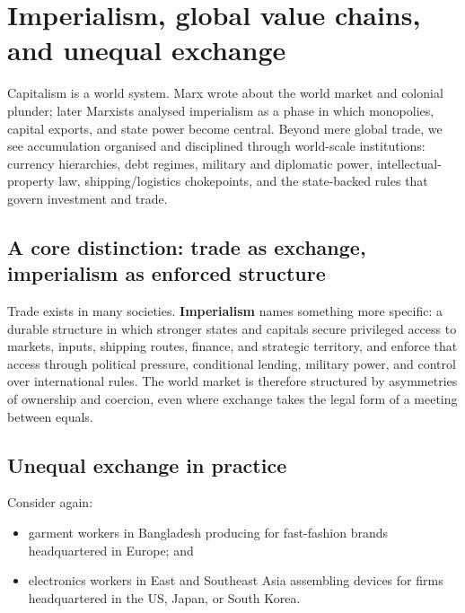 \section{Imperialism, global value chains, and unequal exchange}
\label{sec:imperialism}

Capitalism is a world system. Marx wrote about the world market and colonial plunder; later Marxists
analysed imperialism as a phase in which monopolies, capital exports, and state power become central.\cite{LeninImperialism,PatnaikImperialism}
Beyond mere global trade, we see accumulation organised and
disciplined through world-scale institutions: currency hierarchies, debt regimes, military and diplomatic
power, intellectual-property law, shipping/logistics chokepoints, and the state-backed rules that govern
investment and trade.

\subsection{A core distinction: trade as exchange, imperialism as enforced structure}
\label{sec:imperialism-trade-structure}

Trade exists in many societies. \textbf{Imperialism} names something more specific: a durable structure in
which stronger states and capitals secure privileged access to markets, inputs, shipping routes, finance,
and strategic territory, and enforce that access through political pressure, conditional lending, military
power, and control over international rules.\cite{LeninImperialism,PatnaikImperialism}
The world market is therefore structured by asymmetries of ownership and coercion, even
where exchange takes the legal form of a meeting between equals.

\subsection{Unequal exchange in practice}
\label{sec:unequal-exchange-practice}

Consider again:

\begin{itemize}[leftmargin=1.5em]
  \item garment workers in Bangladesh producing for fast-fashion brands headquartered in Europe; and
  \item electronics workers in East and Southeast Asia assembling devices for firms headquartered in the US, Japan, or South Korea.
\end{itemize}

